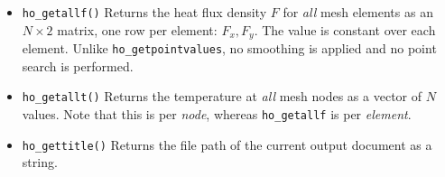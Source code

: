 \begin{itemize}
\item{\tt ho\_getallf()} Returns the heat flux density $F$ for {\em all} mesh
elements as an $N \times 2$ matrix, one row per element: $F_x, F_y$.  The value
is constant over each element.  Unlike {\tt ho\_getpointvalues}, no smoothing is
applied and no point search is performed.

\item{\tt ho\_getallt()} Returns the temperature at {\em all} mesh nodes as a
vector of $N$ values.  Note that this is per {\em node}, whereas
{\tt ho\_getallf} is per {\em element}.


\item{\tt ho\_gettitle()} Returns the file path of the current output document as a string.

\end{itemize}
